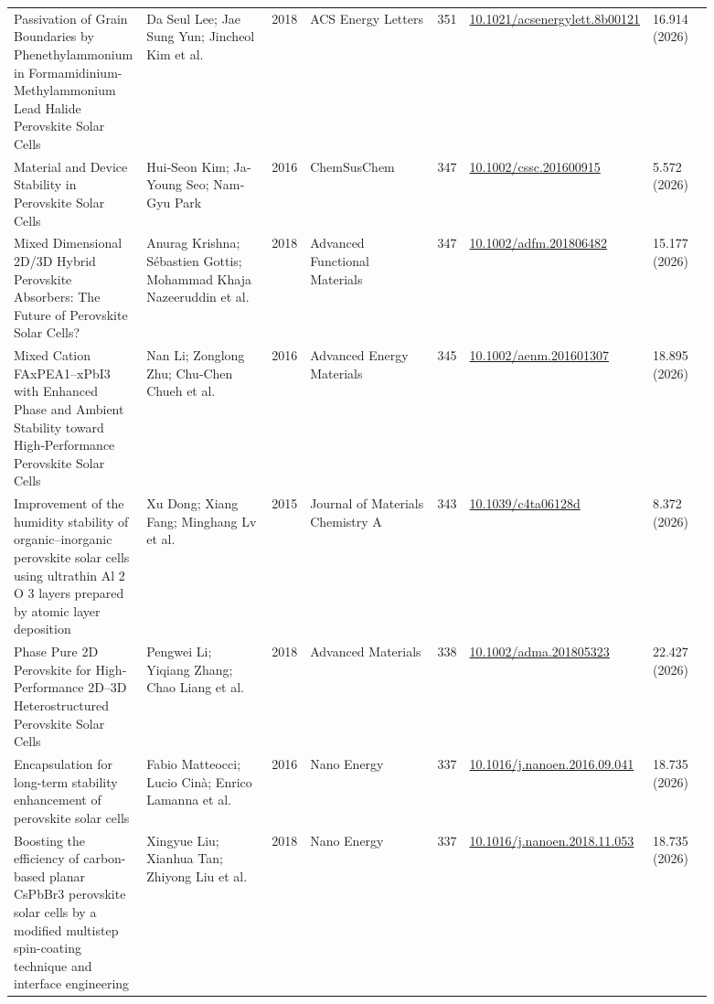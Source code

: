 \documentclass[10pt,a4paper]{article}
\begin{document}
{\begin{longtable}{p{0.197\linewidth}p{0.197\linewidth}p{0.043\linewidth}p{0.197\linewidth}p{0.043\linewidth}p{0.117\linewidth}p{0.098\linewidth}}
Passivation of Grain Boundaries by Phenethylammonium in Formamidinium-Methylammonium Lead Halide Perovskite Solar Cells & Da Seul Lee; Jae Sung Yun; Jincheol Kim et al. & 2018 & ACS Energy Letters & 351 & \href{https://doi.org/10.1021/acsenergylett.8b00121}{10.1021/acsenergylett.8b00121} & 16.914 (2026) \\
Material and Device Stability in Perovskite Solar Cells & Hui‐Seon Kim; Ja‐Young Seo; Nam‐Gyu Park & 2016 & ChemSusChem & 347 & \href{https://doi.org/10.1002/cssc.201600915}{10.1002/cssc.201600915} & 5.572 (2026) \\
Mixed Dimensional 2D/3D Hybrid Perovskite Absorbers: The Future of Perovskite Solar Cells? & Anurag Krishna; Sébastien Gottis; Mohammad Khaja Nazeeruddin et al. & 2018 & Advanced Functional Materials & 347 & \href{https://doi.org/10.1002/adfm.201806482}{10.1002/adfm.201806482} & 15.177 (2026) \\
Mixed Cation FAxPEA1–xPbI3 with Enhanced Phase and Ambient Stability toward High‐Performance Perovskite Solar Cells & Nan Li; Zonglong Zhu; Chu‐Chen Chueh et al. & 2016 & Advanced Energy Materials & 345 & \href{https://doi.org/10.1002/aenm.201601307}{10.1002/aenm.201601307} & 18.895 (2026) \\
Improvement of the humidity stability of organic–inorganic perovskite solar cells using ultrathin Al 2 O 3 layers prepared by atomic layer deposition & Xu Dong; Xiang Fang; Minghang Lv et al. & 2015 & Journal of Materials Chemistry A & 343 & \href{https://doi.org/10.1039/c4ta06128d}{10.1039/c4ta06128d} & 8.372 (2026) \\
Phase Pure 2D Perovskite for High‐Performance 2D–3D Heterostructured Perovskite Solar Cells & Pengwei Li; Yiqiang Zhang; Chao Liang et al. & 2018 & Advanced Materials & 338 & \href{https://doi.org/10.1002/adma.201805323}{10.1002/adma.201805323} & 22.427 (2026) \\
Encapsulation for long-term stability enhancement of perovskite solar cells & Fabio Matteocci; Lucio Cinà; Enrico Lamanna et al. & 2016 & Nano Energy & 337 & \href{https://doi.org/10.1016/j.nanoen.2016.09.041}{10.1016/j.nanoen.2016.09.041} & 18.735 (2026) \\
Boosting the efficiency of carbon-based planar CsPbBr3 perovskite solar cells by a modified multistep spin-coating technique and interface engineering & Xingyue Liu; Xianhua Tan; Zhiyong Liu et al. & 2018 & Nano Energy & 337 & \href{https://doi.org/10.1016/j.nanoen.2018.11.053}{10.1016/j.nanoen.2018.11.053} & 18.735 (2026) \\

\end{longtable}}
\end{document}
